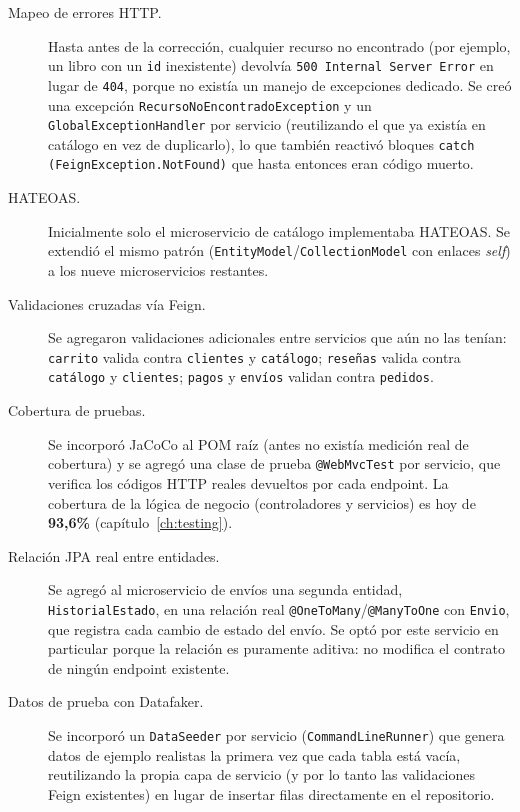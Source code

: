 \begin{description}
    \item[Mapeo de errores HTTP.] Hasta antes de la corrección, cualquier recurso no
    encontrado (por ejemplo, un libro con un \texttt{id} inexistente) devolvía
    \texttt{500 Internal Server Error} en lugar de \texttt{404}, porque no existía un
    manejo de excepciones dedicado. Se creó una excepción
    \texttt{RecursoNoEncontradoException} y un \texttt{GlobalExceptionHandler} por
    servicio (reutilizando el que ya existía en catálogo en vez de duplicarlo), lo que
    también reactivó bloques \texttt{catch (FeignException.NotFound)} que hasta
    entonces eran código muerto.
    \item[HATEOAS.] Inicialmente solo el microservicio de catálogo implementaba
    HATEOAS. Se extendió el mismo patrón (\texttt{EntityModel}/\texttt{CollectionModel}
    con enlaces \textit{self}) a los nueve microservicios restantes.
    \item[Validaciones cruzadas vía Feign.] Se agregaron validaciones adicionales entre
    servicios que aún no las tenían: \texttt{carrito} valida contra \texttt{clientes} y
    \texttt{catálogo}; \texttt{reseñas} valida contra \texttt{catálogo} y
    \texttt{clientes}; \texttt{pagos} y \texttt{envíos} validan contra \texttt{pedidos}.
    \item[Cobertura de pruebas.] Se incorporó JaCoCo al POM raíz (antes no existía
    medición real de cobertura) y se agregó una clase de prueba
    \texttt{@WebMvcTest} por servicio, que verifica los códigos HTTP reales devueltos
    por cada endpoint. La cobertura de la lógica de negocio (controladores y
    servicios) es hoy de \textbf{93,6\%} (capítulo~\ref{ch:testing}).
    \item[Relación JPA real entre entidades.] Se agregó al microservicio de envíos una
    segunda entidad, \texttt{HistorialEstado}, en una relación real
    \texttt{@OneToMany}/\texttt{@ManyToOne} con \texttt{Envio}, que registra cada
    cambio de estado del envío. Se optó por este servicio en particular porque la
    relación es puramente aditiva: no modifica el contrato de ningún endpoint
    existente.
    \item[Datos de prueba con Datafaker.] Se incorporó un \texttt{DataSeeder} por
    servicio (\texttt{CommandLineRunner}) que genera datos de ejemplo realistas la
    primera vez que cada tabla está vacía, reutilizando la propia capa de servicio (y
    por lo tanto las validaciones Feign existentes) en lugar de insertar filas
    directamente en el repositorio.

\end{description}
